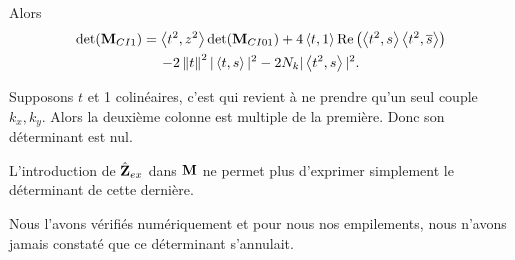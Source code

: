       Alors 
      \begin{multline*}
        \det( {\mathbf{M}}_{CI1}) = \left<{t^2},{z^2}\right>\det({\mathbf{M}}_{CI01}) + 4 \left<{t},{1}\right>\operatorname{Re}\left(\left<{t^2},{s}\right>\left<{t^2},{{\overline{s}}}\right>\right)
        \\
        - 2\left\lVert t\right\rVert^2|\left<{t},{s}\right>|^2 - 2 N_k|\left<{t^2},{s}\right>|^2.
      \end{multline*}


      Supposons \(t\) et 1 colinéaires, c'est qui revient à ne prendre qu'un seul couple \(k_x,k_y\).
      Alors la deuxième colonne est multiple de la première.
      Donc son déterminant est nul.

      L'introduction de \(\hat{\mathbf{Z}}_{ex}\) dans \(\mathbf{M}\) ne permet plus d'exprimer simplement le déterminant de cette dernière.

      Nous l'avons vérifiés numériquement et pour nous nos empilements, nous n'avons jamais constaté que ce déterminant s'annulait.








